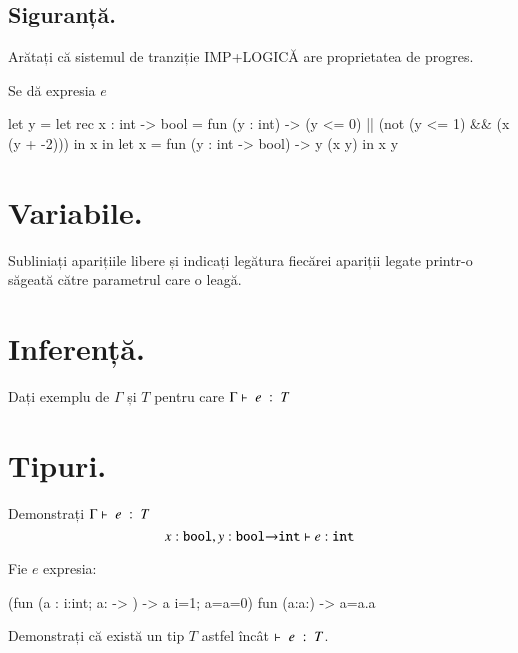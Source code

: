 \documentclass[addpoints,12pt,a4paper,answers]{exam}
\begin{document}
\begin{questions}
\begin{parts}
\part[1] {\bf Siguranță. } Arătați că sistemul de tranziție IMP+LOGICĂ are proprietatea de progres.
\end{parts}

Se dă expresia $e$
\begin{asciiml}
let y = let rec x : int -> bool = 
          fun (y : int) -> (y <= 0) || (not (y <= 1) && (x (y + -2)))
        in x
in let x = fun (y : int -> bool) -> y (x y)
   in x y
\end{asciiml}
\begin{parts}
\part[2] {\bf Variabile. } Subliniați aparițiile libere și indicați legătura fiecărei apariții legate printr-o săgeată către parametrul care o leagă.
\part[1] {\bf Inferență.}  Dați exemplu de $\Gamma$ și $T$ pentru care $\tjud{e}{T}$
\part[2] {\bf Tipuri. } Demonstrați $\tjud{e}{T}$
\[x:{\Sbool},y:{\Sbool \rightarrow \Sint} \vdash e : {\Sint}\]
\end{parts}

Fie $e$ expresia:
\begin{asciiml}
(fun (a : {i:int; a:{}} -> {}) ->  a {i=1; a={a=0}}) fun (a:{a:{}}) ->  {a=a.a}
\end{asciiml}

 Demonstrați că există un tip $T$ astfel încât $\tjud[]{e}{T}$.
\end{questions}

\end{document}
